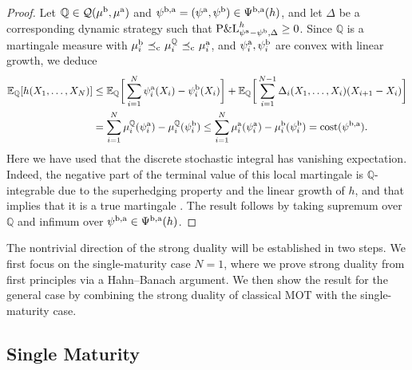 \documentclass[11pt]{article}
\newcommand{\cQ}{\mathcal{Q}}
\newcommand{\Q}{\mathbb{Q}} %
\theoremstyle{plain}
\theoremstyle{definition}
\theoremstyle{remark}
\newcommand{\E}{\mathbb{E}}
\DeclareMathOperator{\cleq}{\,\preceq_{\rm c}\,}
\theoremstyle{plain}
\begin{document}
\begin{proof}
Let $\Q \in  \cQ(\mu^{\rm b}, \mu^{\rm a})$ and $\psi^{\rm b,a} = (\psi^{\rm a},\psi^{\rm b}) \in \Psi^{\rm b,a}(h)$, and let $\Delta$ be a corresponding dynamic strategy such that $\textnormal{P\&L}_{\psi^{\rm a} - \psi^{\rm b},\Delta}^h\ge 0 $. %
%
    Since $\Q$ is a martingale measure with $\mu_i^{\rm b}\cleq \mu_i^{\Q}\cleq \mu_i^{\rm a}$, and  $\psi_i^{\rm a}, \psi_i^{\rm b}$ are convex with linear growth, we deduce
    \begin{align*}
          \E_\Q[h(X_1,\ldots,X_N)] &\leq \E_\Q\bigg[\sum_{i=1}^N \psi_i^{\rm a}(X_i) - \psi_i^{\rm b}(X_i)\bigg] + \E_\Q\bigg[\sum_{i=1}^{N-1}\Delta_i(X_1,\ldots, X_i)(X_{i+1}-X_i)\bigg] \\ 
          &= \sum_{i=1}^N \mu_i^{\Q}(\psi_i^{\rm a}) - \mu_i^{\Q}(\psi_i^{\rm b}) 
          \leq \sum_{i=1}^N \mu_i^{\rm a}(\psi_i^{\rm a}) - \mu_i^{\rm b}(\psi_i^{\rm b})=\text{cost}(\psi^{\rm b,a}).
    \end{align*}
    Here we have used that the discrete stochastic integral has vanishing expectation. Indeed, the negative part of the terminal value of this local martingale is $\Q$-integrable due to the superhedging property and the linear growth of $h$, and that implies that it is a true martingale \cite[Theorem~2]{JacodShiryaev.98}. The result follows by 
    taking supremum over $\Q$ and infimum over $\psi^{\rm b,a} \in \Psi^{\rm b,a}(h)$. %
\end{proof}

The nontrivial direction of the strong duality will be established in two steps. We first focus on the single-maturity case $N=1$, where we prove strong duality from first principles via a Hahn--Banach argument. We then show the result for the general case by combining the strong duality of classical MOT with the single-maturity case.





\subsection{Single Maturity}
\end{document}
